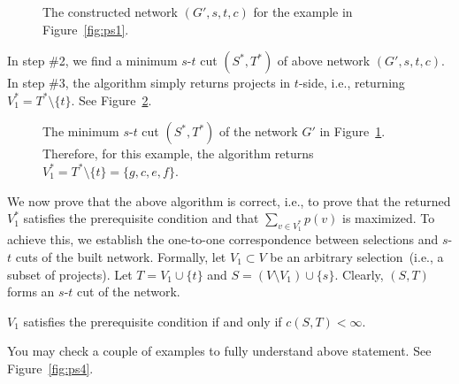 \begin{figure}[!h]
\centering{}
\caption{The constructed network $(G',s,t,c)$ for the example in Figure~\ref{fig:ps1}.}
\label{fig:ps2}
\end{figure}

In step \#2, we find a minimum $s$-$t$ cut $(S^*, T^*)$ of above network $(G',s,t,c)$.
In step \#3, the algorithm simply returns projects in $t$-side, i.e., returning $V_1^* = T^*\setminus \{t\}$.
See Figure~\ref{fig:ps3}.

\begin{figure}[!h]
\centering{}
\caption{The minimum $s$-$t$ cut $(S^*, T^*)$ of the network $G'$ in Figure~\ref{fig:ps2}.
Therefore, for this example, the algorithm returns $V_1^* = T^*\setminus\{t\} = \{g,c,e,f\}$.}
\label{fig:ps3}
\end{figure}

We now prove that the above algorithm is correct, i.e., to prove that the returned $V_1^*$ satisfies
the prerequisite condition and that $\sum_{v\in V_1^*} p(v)$ is maximized.
To achieve this, we establish the one-to-one correspondence between 
selections and $s$-$t$ cuts of the built network.
Formally, let $V_1 \subset V$ be an arbitrary selection~(i.e., a subset of projects). 
Let $T = V_1\cup \{t\}$ and $S = (V\setminus V_1)\cup \{s\}$.  
Clearly, $(S,T)$ forms an $s$-$t$ cut of the network.  

\begin{fact}
$V_1$ satisfies the prerequisite condition if and only if $c(S, T) < \infty$.
\label{fact1}
\end{fact}

You may check a couple of examples to fully understand above statement.
See Figure~\ref{fig:ps4}. 

